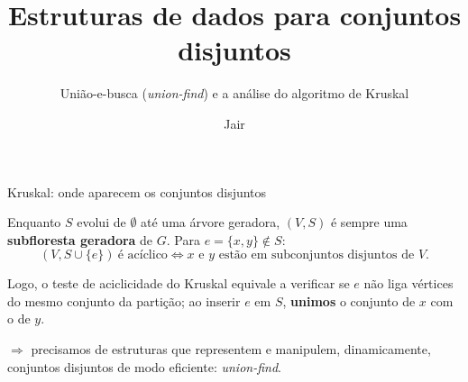 \documentclass[aspectratio=169,10pt]{beamer}
\title[Conjuntos disjuntos]{Estruturas de dados para conjuntos disjuntos}
\subtitle{União-e-busca (\textit{union-find}) e a análise do algoritmo de Kruskal}
\author{Jair}
\institute{CMCC -- UFABC}
\date{}
\newcommand{\Cria}{\mathtt{cria}}
\newcommand{\Busca}{\mathtt{busca}}
\newcommand{\Uniao}{\mathtt{uniao}}
\renewcommand{\lg}{\operatorname{lg}}
\newcommand{\lgs}{\lg^{*}}
\begin{document}
\begin{frame}[plain]
  \titlepage
\end{frame}

% 
 \begin{frame}[c]{Kruskal: onde aparecem os conjuntos disjuntos}

   Enquanto $S$ evolui de $\emptyset$ até uma árvore geradora, $(V,S)$
   é sempre uma \textbf{subfloresta geradora} de $G$.  Para
   $e=\{x,y\}\notin S$:
   \[
     (V,S\cup\{e\})\ \text{é acíclico}\iff
     {   x\text{ e }y\text{ estão em subconjuntos disjuntos de }V.}
   \]

   \medskip

   {Logo, o teste de aciclicidade do Kruskal equivale a verificar se $e$
   não liga vértices do mesmo conjunto da partição; ao inserir $e$ em
   $S$, \textbf{unimos} o conjunto de $x$ com o de $y$.}
 
   \medskip

   $\Rightarrow$ precisamos de estruturas que representem e manipulem,
   dinamicamente, conjuntos disjuntos de modo eficiente:
   \textit{union-find}.

 \end{frame}
 
\end{document}
